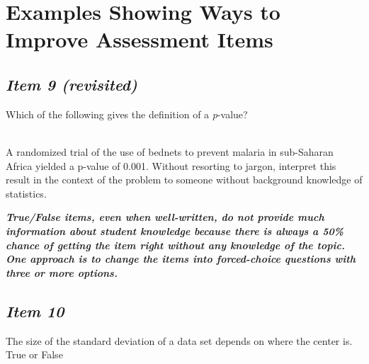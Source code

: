 \section{\textbf{Examples Showing Ways to Improve Assessment Items}}


\subsection{\textbf{\textit{Item 9 (revisited)}}}


Which of the following gives the definition of a \textit{p}-value?


\vspace{8pt}





\noindent{} \\


A randomized trial of the
use of bednets to prevent malaria in sub-Saharan Africa yielded a p-value of 0.001. Without resorting to jargon, interpret this result in the context of the problem to someone without background knowledge of statistics.





\vspace{.3in} 


\noindent
\textbf{\textit{True/False items, even when well-written, do not provide much information about student knowledge because there is always a 50\% chance of getting the item right without any knowledge of the topic. One approach is to change the items into forced-choice questions with three or more options.}}


\subsection{\textbf{\textit{Item 10}}}


The size of the standard deviation of a data set depends on where the center is. True or False\\


\vspace{8pt}





